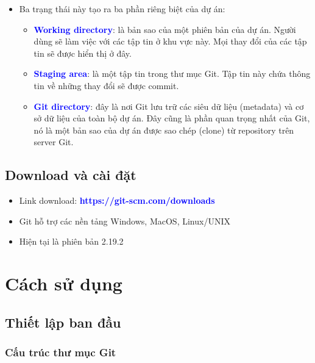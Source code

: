 \documentclass[12pt,a4paper]{report}
\begin{document}
\begin{itemize}
\begin{itemize}
	\end{itemize}
\item Ba trạng thái này tạo ra ba phần riêng biệt của dự án:
	\begin{itemize}
		\item \textcolor{blue}{\bf Working directory}: là bản sao của một phiên bản của dự án. Người dùng sẽ làm việc với các tập tin ở khu vực này. Mọi thay đổi của các tập tin sẽ được hiển thị ở đây.
		\item \textcolor{blue}{\bf Staging area}: là một tập tin trong thư mục Git. Tập tin này chứa thông tin về những thay đổi sẽ được commit.
		\item \textcolor{blue}{\bf Git directory}: đây là nơi Git lưu trữ các siêu dữ liệu (metadata) và cơ sở dữ liệu của toàn bộ dự án. Đây cũng là phần quan trọng nhất của Git, nó là một bản sao của dự án được sao chép (clone) từ repository trên server Git.
		\end{itemize}
\end{itemize}
\newpage
\section{Download và cài đặt}


\begin{itemize}
\item Link download: \textcolor{blue}{\bf https://git-scm.com/downloads }
\item Git hỗ trợ các nền tảng Windows, MacOS, Linux/UNIX
\item Hiện tại là phiên bản 2.19.2
\end{itemize}


\newpage %





\chapter{Cách sử dụng} 


\section{Thiết lập ban đầu} 
\subsection{Cấu trúc thư mục Git}  
\end{document}
